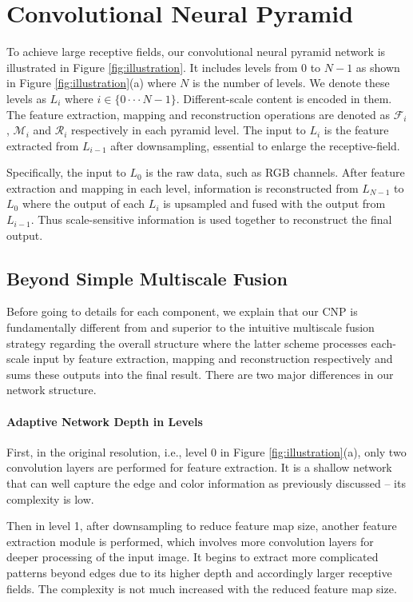 \documentclass[10pt,twocolumn,letterpaper]{article}
\begin{document}
\section{Convolutional Neural Pyramid}

To achieve large receptive fields, our convolutional neural pyramid network is
illustrated in Figure \ref{fig:illustration}. It includes levels from $0$ to $N-1$ as
shown in Figure \ref{fig:illustration}(a) where $N$ is the number of levels. We denote
these levels as $L_i$ where $i\in \{0\cdot\cdot\cdot N-1\}$. Different-scale content is
encoded in them. The feature extraction, mapping and reconstruction operations are
denoted as $\mathcal{F}_i$, $\mathcal{M}_i$ and $\mathcal{R}_i$ respectively in each
pyramid level. The input to $L_i$ is the feature extracted from $L_{i-1}$ after
downsampling, essential to enlarge the receptive-field.

Specifically, the input to $L_0$ is the raw data, such as RGB channels. After feature
extraction and mapping in each level, information is reconstructed from $L_{N-1}$ to
$L_0$ where the output of each $L_i$ is upsampled and fused with the output from
$L_{i-1}$. Thus scale-sensitive information is used together to reconstruct the final
output.

\subsection{Beyond Simple Multiscale Fusion}
\label{sec:simplefus} Before going to details for each component, we explain that our CNP
is fundamentally different from and superior to the intuitive multiscale fusion strategy
regarding the overall structure where the latter scheme processes each-scale input by
feature extraction, mapping and reconstruction respectively and sums these outputs into
the final result. There are two major differences in our network structure.

\vspace{-0.15in}\paragraph{Adaptive Network Depth in Levels} First, in the original
resolution, i.e., level 0 in Figure \ref{fig:illustration}(a), only two convolution
layers are performed for feature extraction. It is a shallow network that can well
capture the edge and color information as previously discussed -- its complexity is low.

Then in level 1, after downsampling to reduce feature map size, another feature extraction
module is performed, which involves more convolution layers for deeper processing of the
input image. It begins to extract more complicated patterns beyond edges due to its
higher depth and accordingly larger receptive fields. The complexity is not much
increased with the reduced feature map size.
\end{document}
